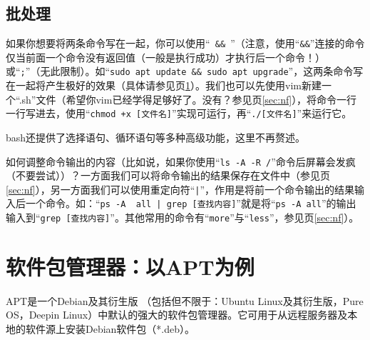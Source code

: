 \subsection{批处理}
\label{sec:bat}如果你想要将两条命令写在一起，你可以使用“\verb| && |”（注意，使用“\verb|&&|”连接的命令仅当前面一个命令没有返回值（一般是执行成功）才执行后一个命令！）或“\verb|;|”（无此限制）。如“\verb|sudo apt update && sudo apt upgrade|”，这两条命令写在一起将产生极好的效果（具体请参见\pageref{sec:apt}页\ref{sec:apt}）。我们也可以先使用vim新建一个“.sh”文件（希望你vim已经学得足够好了。没有？参见\pageref{sec:nf}页\ref{sec:nf}），将命令一行一行写进去，使用“\verb|chmod +x [文件名]|”实现可运行，再“\verb|./[文件名]|”来运行它。\par
bash还提供了选择语句、循环语句等多种高级功能，这里不再赘述。\par
如何调整命令输出的内容（比如说，如果你使用“\verb|ls -A -R /|”命令后屏幕会发疯（不要尝试））？一方面我们可以将命令输出的结果保存在文件中（参见\pageref{sec:nf}页\ref{sec:nf}），另一方面我们可以使用重定向符“\verb/|/”，作用是将前一个命令输出的结果输入后一个命令。如：“\verb/ps -A  all | grep [查找内容]/”就是将“\verb|ps -A all|”的输出输入到“\verb|grep [查找内容]|”。其他常用的命令有“\verb|more|”与“\verb|less|”，参见\pageref{sec:nf}页\ref{sec:nf}）。
\section{软件包管理器：以APT为例}
\label{sec:apt}APT是一个Debian及其衍生版 （包括但不限于：Ubuntu Linux及其衍生版，Pure OS，Deepin Linux）中默认的强大的软件包管理器。它可用于从远程服务器及本地的软件源上安装Debian软件包（*.deb）。
